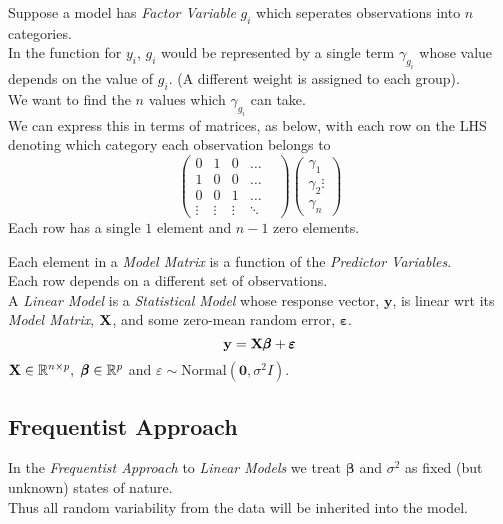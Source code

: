 \documentclass[11pt,a4paper]{article}
\begin{document}
Suppose a model has \textit{Factor Variable} $g_i$ which seperates observations into $n$ categories.\\
In the function for $y_i$, $g_i$ would be represented by a single term $\gamma_{g_i}$ whose value depends on the value of $g_i$. (\ie A different weight is assigned to each group). \\
We want to find the $n$ values which $\gamma_{g_i}$ can take.\\
We can express this in terms of matrices, as below, with each row on the LHS denoting which category each observation belongs to
$$\begin{pmatrix}0&1&0&\dots&\\1&0&0&\dots\\0&0&1&\dots\\\vdots&\vdots&\vdots&\ddots\end{pmatrix}\begin{pmatrix}\gamma_1\\\gamma_2\vdots\\\gamma_n\end{pmatrix}$$
\nb Each row has a single $1$ element and $n-1$ zero elements.\\


Each element in a \textit{Model Matrix} is a function of the \textit{Predictor Variables}.\\
Each row depends on a different set of observations.\\

A \textit{Linear Model} is a \textit{Statistical Model} whose response vector, $\textbf{y}$, is linear wrt its \textit{Model Matrix}, $\textbf{X}$, and some zero-mean random error, $\pmb\varepsilon$.
$$\textbf{y}=\textbf{X}\pmb\beta+\pmb\varepsilon$$
$\X\in\reals^{n\times p},\ \pmb\beta\in\reals^p$ and $\varepsilon\sim\text{Normal}(\pmb0,\sigma^2 I)$.

\subsection{Frequentist Approach}

In the \textit{Frequentist Approach} to \textit{Linear Models} we treat $\pmb\beta$ and $\sigma^2$ as fixed (but unknown) states of nature.\\
Thus all random variability from the data will be inherited into the model.\\
\end{document}
